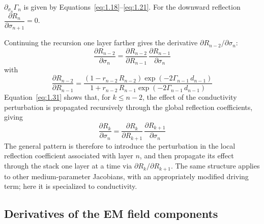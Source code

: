 \documentclass[12pt]{report}
\newcommand{\pds}[1]{\partial_{\sigma_{#1}}}   %
\begin{document}
\(\pds{n}\Gamma_n\) is given by Equations~\eqref{eq:1.18}--\eqref{eq:1.21}.
For the downward reflection \(\dfrac{\partial R_n}{\partial
\sigma_{n+1}} = 0\).

Continuing the recursion one layer farther gives the derivative
\(\partial R_{n-2}/\partial\sigma_n\):
\begin{equation}
    \frac{\partial R_{n-2}}{\partial \sigma_n} =
        \frac{\partial R_{n-2}}{\partial R_{n-1}}\,\frac{\partial R_{n-1}}{\partial \sigma_n}
    \label{eq:1.31}
\end{equation}
with
\begin{equation}
    \frac{\partial R_{n-2}}{\partial R_{n-1}} =
        \frac{(1 - r_{n-2}\,R_{n-2})\exp(-2\Gamma_{n-1}\,d_{n-1})}
             {1 + r_{n-2}\,R_{n-1}\exp(-2\Gamma_{n-1}\,d_{n-1})}
    \label{eq:1.32}
\end{equation}
Equation~\eqref{eq:1.31} shows that, for \(k\leq n-2\), the effect of
the conductivity perturbation is propagated recursively through the global
reflection coefficients, giving
\begin{equation}
    \frac{\partial R_k}{\partial \sigma_n} =
        \frac{\partial R_k}{\partial R_{k+1}}\,\frac{\partial R_{k+1}}{\partial \sigma_n}
    \label{eq:1.33}
\end{equation}
The general pattern is therefore to introduce the perturbation in the
local reflection coefficient associated with layer \(n\), and then
propagate its effect through the stack one layer at a time via
\(\partial R_k/\partial R_{k+1}\). The same structure applies to other
medium-parameter Jacobians, with an appropriately modified driving term;
here it is specialized to conductivity.

\subsection{Derivatives of the EM field components}
\label{sec:field_comps}
\end{document}
